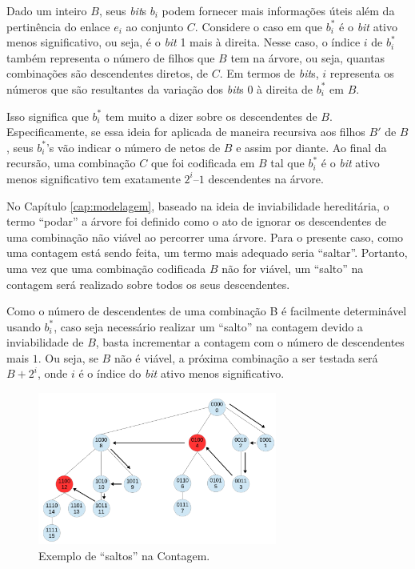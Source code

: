 Dado um inteiro $B$, seus {\it bit}s $b_i$ podem fornecer mais informações úteis além da pertinência do enlace $e_i$ ao conjunto $C$. Considere o caso em que $b_i^*$ é o {\it bit} ativo menos significativo, ou seja, é o {\it bit} 1 mais à direita. Nesse caso, o índice $i$ de $b_i^*$ também representa o número de filhos que $B$ tem na árvore, ou seja, quantas combinações são descendentes diretos, de $C$. Em termos de {\it bit}s, $i$ representa os números que são resultantes da variação dos {\it bit}s 0 à direita de $b_i^*$ em $B$.

Isso significa que $b_i^*$ tem muito a dizer sobre os descendentes de $B$. Especificamente, se essa ideia for aplicada de maneira recursiva aos filhos $B'$ de $B$, seus $b_i^*$’s vão indicar o número de netos de $B$ e assim por diante. Ao final da recursão, uma combinação $C$ que foi codificada em $B$ tal que $b_i^*$ é o {\it bit} ativo menos significativo tem exatamente $2^i–1$ descendentes na árvore.

No Capítulo \ref{cap:modelagem}, baseado na ideia de inviabilidade hereditária, o termo ``podar'' a árvore foi definido como o ato de ignorar os descendentes de uma combinação não viável ao percorrer uma árvore. Para o presente caso, como uma contagem está sendo feita, um termo mais adequado seria ``saltar''. Portanto, uma vez que uma combinação codificada $B$ não for viável, um ``salto'' na contagem será realizado sobre todos os seus descendentes.

Como o número de descendentes de uma combinação B é facilmente determinável usando $b_i^*$, caso seja necessário realizar um ``salto'' na contagem devido a inviabilidade de $B$, basta incrementar a contagem com o número de descendentes mais $1$. Ou seja, se $B$ não é viável, a próxima combinação a ser testada será $B + 2^i$, onde $i$ é o índice do {\it bit} ativo menos significativo.

\begin{figure}[htb]
\centering
\includegraphics[width=0.7\textwidth]{figs/saltos}
\caption[Exemplo de ``saltos'' na Contagem.]
{Exemplo de ``saltos'' na Contagem.}
\label{fig:saltos}
\end{figure}

